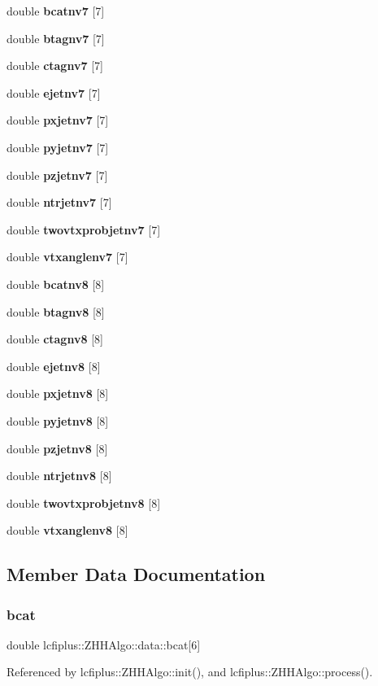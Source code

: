 \begin{DoxyCompactItemize}
double \textbf{ bcatnv7} [7]
\item 
double \textbf{ btagnv7} [7]
\item 
double \textbf{ ctagnv7} [7]
\item 
double \textbf{ ejetnv7} [7]
\item 
double \textbf{ pxjetnv7} [7]
\item 
double \textbf{ pyjetnv7} [7]
\item 
double \textbf{ pzjetnv7} [7]
\item 
double \textbf{ ntrjetnv7} [7]
\item 
double \textbf{ twovtxprobjetnv7} [7]
\item 
double \textbf{ vtxanglenv7} [7]
\item 
double \textbf{ bcatnv8} [8]
\item 
double \textbf{ btagnv8} [8]
\item 
double \textbf{ ctagnv8} [8]
\item 
double \textbf{ ejetnv8} [8]
\item 
double \textbf{ pxjetnv8} [8]
\item 
double \textbf{ pyjetnv8} [8]
\item 
double \textbf{ pzjetnv8} [8]
\item 
double \textbf{ ntrjetnv8} [8]
\item 
double \textbf{ twovtxprobjetnv8} [8]
\item 
double \textbf{ vtxanglenv8} [8]
\end{DoxyCompactItemize}


\subsection{Member Data Documentation}
\mbox{\label{structlcfiplus_1_1ZHHAlgo_1_1data_a6fcb9ce285bf3d4533e2561169457f2f}} 
\subsubsection{bcat}
{\footnotesize\ttfamily double lcfiplus\+::\+Z\+H\+H\+Algo\+::data\+::bcat[6]}



Referenced by lcfiplus\+::\+Z\+H\+H\+Algo\+::init(), and lcfiplus\+::\+Z\+H\+H\+Algo\+::process().

\mbox{\label{structlcfiplus_1_1ZHHAlgo_1_1data_a752d7d257df5cade66beffad42c5e522}} 
